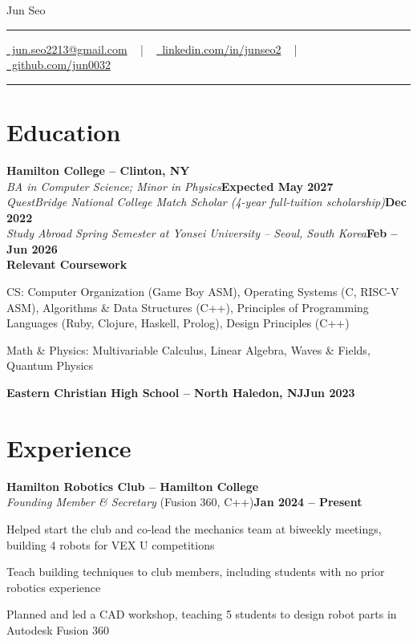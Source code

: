 \documentclass[letterpaper,10pt]{article}
\newcommand{\documentTitle}[2]{
  \begin{center}
    {\Huge\color{accentTitle} #1}
    \vspace{10pt}
    {\color{accentLine} \hrule}
    \vspace{2pt}
    \footnotesize{#2}
    \vspace{2pt}
    {\color{accentLine} \hrule}
  \end{center}
}
\newcommand{\heading}[2]{
  \hspace{10pt}#1\hfill#2\\
}
\newcommand{\headingBf}[2]{
  \heading{\textbf{#1}}{\textbf{#2}}
}
\newenvironment{resume_list}{
  \vspace{-7pt}
  \begin{itemize}[itemsep=-2px, parsep=1pt, leftmargin=30pt]
}{
  \end{itemize}
}
\begin{document}

  \documentTitle{Jun Seo}{
    \href{mailto:jun.seo2213@gmail.com}{
      \raisebox{-0.15\height} \faEnvelope\ jun.seo2213@gmail.com} ~ | ~
    \href{https://www.linkedin.com/in/junseo2/}{
      \raisebox{-0.15\height} \faLinkedin\ linkedin.com/in/junseo2} ~ | ~
    \href{https://github.com/jun0032}{
      \raisebox{-0.15\height} \faGithub\ github.com/jun0032}
  }


  \section{Education}

  \headingBf{Hamilton College -- Clinton, NY}{}
  \heading{\textit{BA in Computer Science; Minor in Physics}}{\textbf{Expected May 2027}}
  \heading{\textit{QuestBridge National College Match Scholar (4-year full-tuition scholarship)}}{\textbf{Dec 2022}}
  \heading{\textit{Study Abroad Spring Semester at Yonsei University -- Seoul, South Korea}}{\textbf{Feb -- Jun 2026}}
  \headingBf{Relevant Coursework}{}
  \begin{resume_list}
    \item CS: Computer Organization (Game Boy ASM), Operating Systems (C, RISC-V ASM), Algorithms \& Data Structures (C++), Principles of Programming Languages (Ruby, Clojure, Haskell, Prolog), Design Principles (C++)
    \item Math \& Physics: Multivariable Calculus, Linear Algebra, Waves \& Fields, Quantum Physics
  \end{resume_list}

  \headingBf{Eastern Christian High School -- North Haledon, NJ}{Jun 2023}


  \section{Experience}

  \headingBf{Hamilton Robotics Club -- Hamilton College}{}
  \heading{\textit{Founding Member \& Secretary} \textnormal{(Fusion 360, C++)}}{\textbf{Jan 2024 -- Present}}
  \begin{resume_list}
    \item Helped start the club and co-lead the mechanics team at biweekly meetings, building 4 robots for VEX U competitions
    \item Teach building techniques to club members, including students with no prior robotics experience
    \item Planned and led a CAD workshop, teaching 5 students to design robot parts in Autodesk Fusion 360
  \end{resume_list}
\end{document}
